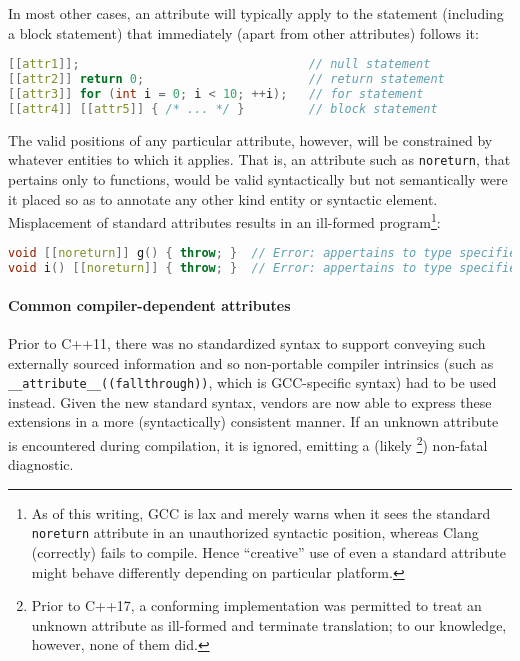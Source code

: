 \documentclass[twoside,10pt,letterpaper,usenames]{newstyle-PearsonGeneric-7-38}
\begin{document}
In most other cases, an attribute will typically apply to the statement
(including a block statement) that immediately (apart from other
attributes) follows it:

\begin{lstlisting}[language=C++]
[[attr1]];                                // null statement
[[attr2]] return 0;                       // return statement
[[attr3]] for (int i = 0; i < 10; ++i);   // for statement
[[attr4]] [[attr5]] { /* ... */ }         // block statement
\end{lstlisting}
    

The valid positions of any particular attribute, however, will be
constrained by whatever entities to which it applies. That is, an
attribute such as \texttt{noreturn}, that pertains only to functions,
would be valid syntactically but not semantically were it placed so as
to annotate any other kind entity or syntactic element. Misplacement of
standard attributes results in an ill-formed
program{\cprotect\footnote{As of this writing, GCC is lax and merely
warns when it sees the standard \texttt{noreturn} attribute in an
unauthorized syntactic position, whereas Clang (correctly) fails to
compile. Hence ``creative'' use of even a standard attribute might
behave differently depending on particular platform.}}:

\begin{lstlisting}[language=C++]
void [[noreturn]] g() { throw; }  // Error: appertains to type specifier
void i() [[noreturn]] { throw; }  // Error: appertains to type specifier
\end{lstlisting}
    

\paragraph[Common compiler-dependent attributes]{Common compiler-dependent attributes}\label{common-compiler-dependent-attributes}

Prior to C++11, there was no standardized syntax to support conveying
such externally sourced information and so non-portable compiler
intrinsics (such as \texttt{\_\_attribute\_\_((fallthrough))}, which is
GCC-specific syntax) had to be used instead. Given the new standard
syntax, vendors are now able to express these extensions in a more
(syntactically) consistent manner. If an unknown attribute is
encountered during compilation, it is ignored, emitting a (likely
{\cprotect\footnote{Prior to C++17, a conforming implementation was
permitted to treat an unknown attribute as ill-formed and terminate
translation; to our knowledge, however, none of them did.}}) non-fatal
diagnostic.
\end{document}
